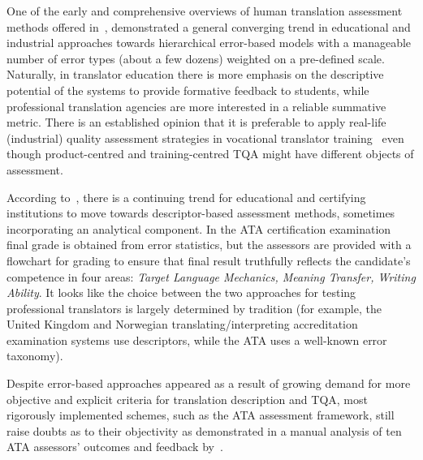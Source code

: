 One of the early and comprehensive overviews of human translation assessment methods offered in~\citet{Secara2005}, demonstrated a general converging trend in educational and industrial approaches towards hierarchical error-based models with a manageable number of error types (about a few dozens) weighted on a pre-defined scale. Naturally, in translator education there is more emphasis on the descriptive potential of the systems to provide formative feedback to students, while professional translation agencies are more interested in a reliable summative metric. 
There is an established opinion that it is preferable to apply real-life (industrial) quality assessment strategies in vocational translator training~\cite{Doyle2003, Koby2005, Williams2013} even though product-centred and training-centred TQA might have different objects of assessment. 

According to~\citet{Hegrenaes2020}, there is a continuing trend for educational and certifying institutions to move towards descriptor-based assessment methods, sometimes incorporating an analytical component. In the \gls{ATA} certification examination final grade is obtained from error statistics, but the assessors are provided with a flowchart for grading to ensure that final result truthfully reflects the candidate's competence in four areas: \textit{Target Language Mechanics, Meaning Transfer, Writing Ability}. 
It looks like the choice between the two approaches for testing professional translators is largely determined by tradition (for example, the United Kingdom and Norwegian translating/interpreting accreditation examination systems use descriptors, while the ATA uses a well-known error taxonomy).

Despite error-based approaches appeared as a result of growing demand for more objective and explicit criteria for translation description and TQA, most rigorously implemented schemes, such as the ATA assessment framework, still raise doubts as to their objectivity as demonstrated in a manual analysis of ten ATA assessors' outcomes and feedback by~\citet{Phelan2017}. 

